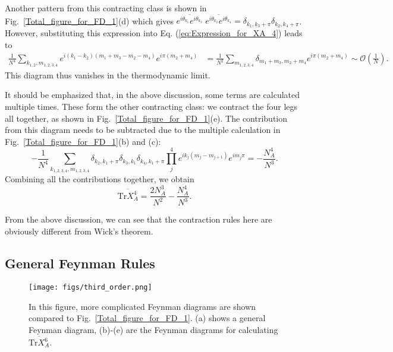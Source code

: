 \documentclass[aps,onecolumn,nofootinbib,superscriptaddress,notitlepage,longbibliography]{revtex4-1}
\def \Tr {\mathrm{Tr}}
\begin{document}
Another pattern from this contracting class is shown in Fig.~\ref{Total_figure_for_FD_1}(d)
which gives $\overline{e^{i\theta_{k_{1}}}e^{i\theta_{k_{3}}}}\;\overline{e^{i\theta_{k_{2}}}e^{i\theta_{k_{4}}}}=\delta_{k_{1},k_{3}+\pi}\delta_{k_{2},k_{4}+\pi}$.
However, substituting this expression into Eq. (\ref{eq:Expression_for_XA_4})
leads to
\begin{equation}
\begin{aligned}\frac{1}{N^{4}}\sum_{k_{1,2},m_{1,2,3,4}}e^{i(k_{1}-k_{2})(m_{1}+m_{3}-m_{2}-m_{4})}e^{i\pi(m_{2}+m_{4})} & =\frac{1}{N^{2}}\sum_{m_{1,2,3,4}}\delta_{m_{1}+m_{3},m_{2}+m_{4}}e^{i\pi(m_{2}+m_{4})} \sim \mathcal{O}\left(\frac{1}{N}\right).
\end{aligned}
\end{equation}
This diagram thus %
vanishes in the thermodynamic limit. 

It should be emphasized that, in the above discussion, some terms %
are calculated multiple times.
These form the other contracting class: we contract the four legs
all together, as shown in Fig.~\ref{Total_figure_for_FD_1}(e). The
contribution from this diagram needs to be subtracted due to the multiple
calculation in Fig.~\ref{Total_figure_for_FD_1}(b) and (c):
\begin{equation}
-\frac{1}{N^{4}}\sum_{k_{1,2,3,4},m_{1,2,3,4}}\delta_{k_{2},k_{1}+\pi}\delta_{k_{3},k_{1}}\delta_{k_{4},k_{1}+\pi}\prod_{j}^{4}e^{ik_{j}(m_{j}-m_{j+1})}e^{im_{j}\pi}=-\frac{N_{A}^{4}}{N^{3}}.
\end{equation}
Combining all the contributions %
together, we obtain 
\begin{equation}
\overline{\Tr X_{A}^{4}}=\frac{2N_{A}^{3}}{N^{2}}-\frac{N_{A}^{4}}{N^{3}}.
\end{equation}

From the above discussion, we can see that the contraction rules here
are obviously different from %
Wick's theorem. 



\subsection{General Feynman Rules}

\begin{figure*}
\texttt{[image: figs/third\_order.png]}
\caption{In this figure, more complicated Feynman diagrams are shown compared %
to Fig.~\ref{Total_figure_for_FD_1}. (a) shows a general Feynman diagram,
(b)-(e) are the Feynman diagrams for calculating $\overline{\Tr X_{A}^{6}}$.}
\label{Total_figure_for_FD_2}
\end{figure*}
\end{document}
